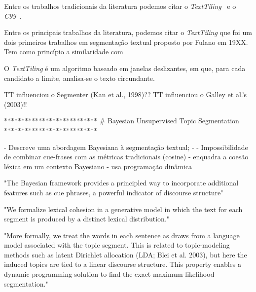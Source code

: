 



Entre os trabalhos tradicionais da literatura podemos citar o  \textit{TextTiling}~\cite{Hearst1994} e o \textit{C99}~\cite{Choi2000}. 

Entre os principais trabalhos da literatura, podemos citar o \textit{TextTiling} que foi um dois primeiros trabalhos em segmentação textual proposto por Fulano em 19XX. Tem como princípio a similaridade com


O \textit{TextTiling} é um algoritmo baseado em janelas deslizantes, em  que, para cada candidato a limite, analisa-se o texto circundante.







TT influenciou o Segmenter (Kan et al., 1998)??
TT influenciou o Galley et al.’s (2003)!!

















***************************
# Bayesian Unsupervised Topic Segmentation
***************************

- Descreve uma abordagem Bayesiana à segmentação textual;
- 
- Impossibilidade de combinar cue-frases com as métricas tradicionais (cosine)
- {enquadra a coesão léxica em um contexto Bayesiano}
- usa programação dinâmica

"The Bayesian framework provides a principled way to incorporate additional features such as cue phrases, a powerful indicator of discourse structure"


"We formalize lexical cohesion in a generative model in which the text for each segment is produced by a distinct lexical distribution." 


"More formally, we treat the words in each sentence as draws from a language model associated with the topic segment. This is related to topic-modeling methods such as latent Dirichlet allocation (LDA; Blei et al. 2003), but here the induced topics are tied to a linear discourse structure. This property enables a dynamic programming solution to find the exact maximum-likelihood segmentation." 

